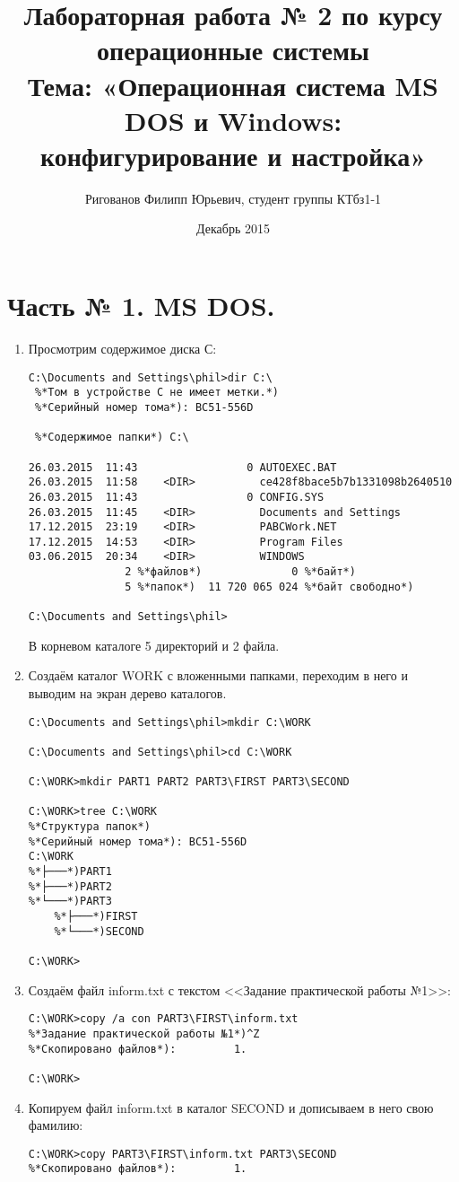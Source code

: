 \documentclass{article}
\title{Лабораторная работа № 2 по курсу операционные системы \\
Тема: «Операционная система MS DOS и Windows: \\
конфигурирование и настройка»}
\author{Ригованов Филипп Юрьевич, студент группы КТбз1-1}
\date{Декабрь 2015}
\begin{document}
\maketitle
\section*{Часть № 1. MS DOS.}
\begin{enumerate}
\item
Просмотрим содержимое диска С:
\begin{lstlisting}[language={},numbers={}]
C:\Documents and Settings\phil>dir C:\
 %*Том в устройстве C не имеет метки.*)
 %*Серийный номер тома*): BC51-556D

 %*Содержимое папки*) C:\

26.03.2015  11:43                 0 AUTOEXEC.BAT
26.03.2015  11:58    <DIR>          ce428f8bace5b7b1331098b2640510
26.03.2015  11:43                 0 CONFIG.SYS
26.03.2015  11:45    <DIR>          Documents and Settings
17.12.2015  23:19    <DIR>          PABCWork.NET
17.12.2015  14:53    <DIR>          Program Files
03.06.2015  20:34    <DIR>          WINDOWS
               2 %*файлов*)              0 %*байт*)
               5 %*папок*)  11 720 065 024 %*байт свободно*)

C:\Documents and Settings\phil>
\end{lstlisting}
В корневом каталоге 5 директорий и 2 файла.
\newpage
\item
Создаём каталог WORK с вложенными папками, переходим в него и выводим на экран дерево каталогов.
\begin{lstlisting}[language={},numbers={}]
C:\Documents and Settings\phil>mkdir C:\WORK

C:\Documents and Settings\phil>cd C:\WORK

C:\WORK>mkdir PART1 PART2 PART3\FIRST PART3\SECOND

C:\WORK>tree C:\WORK
%*Структура папок*)
%*Серийный номер тома*): BC51-556D
C:\WORK
%*├───*)PART1
%*├───*)PART2
%*└───*)PART3
    %*├───*)FIRST
    %*└───*)SECOND

C:\WORK>
\end{lstlisting}
\item
Создаём файл inform.txt с текстом <<Задание практической работы №1>>:
\begin{lstlisting}[language={},numbers={}]
C:\WORK>copy /a con PART3\FIRST\inform.txt
%*Задание практической работы №1*)^Z
%*Скопировано файлов*):         1.

C:\WORK>
\end{lstlisting}
\item
Копируем файл inform.txt в каталог SECOND и дописываем в него свою фамилию:
\begin{lstlisting}[language={},numbers={}]
C:\WORK>copy PART3\FIRST\inform.txt PART3\SECOND
%*Скопировано файлов*):         1.


\end{lstlisting}
\end{enumerate}
\end{document}
